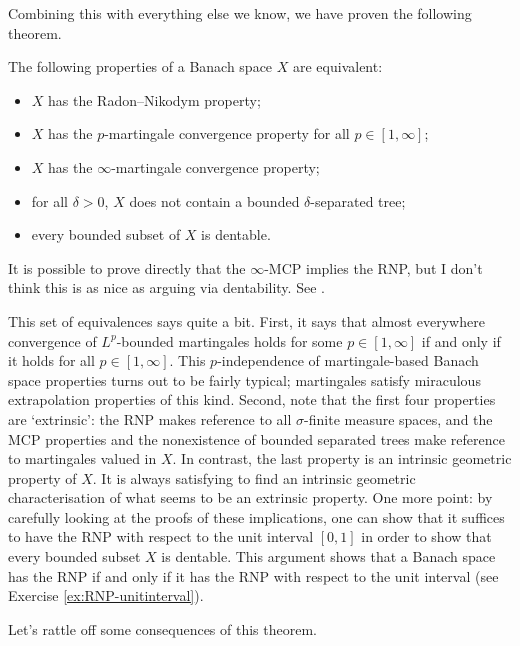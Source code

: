Combining this with everything else we know, we have proven the following theorem.
\begin{thm}\label{thm:RNP-characterisations}
  The following properties of a Banach space $X$ are equivalent:
  \begin{itemize}
  \item $X$ has the Radon--Nikodym property;
  \item $X$ has the $p$-martingale convergence property for all $p \in [1,\infty]$;
  \item $X$ has the $\infty$-martingale convergence property;
  \item for all $\delta > 0$, $X$ does not contain a bounded $\delta$-separated tree;
  \item every bounded subset of $X$ is dentable.
  \end{itemize}
\end{thm}

\begin{rmk}
  It is possible to prove directly that the $\infty$-MCP implies the RNP, but I don't think this is as nice as arguing via dentability.
  See \cite[Proof of Theorem 2.9]{gP16}.
\end{rmk}

This set of equivalences says quite a bit.
First, it says that almost everywhere convergence of $L^p$-bounded martingales holds for some $p \in [1,\infty]$ if and only if it holds for all $p \in [1,\infty]$.
This $p$-independence of martingale-based Banach space properties turns out to be fairly typical; martingales satisfy miraculous extrapolation properties of this kind.
Second, note that the first four properties are `extrinsic': the RNP makes reference to all $\sigma$-finite measure spaces, and the MCP properties and the nonexistence of bounded separated trees make reference to martingales valued in $X$.
In contrast, the last property is an intrinsic geometric property of $X$.
It is always satisfying to find an intrinsic geometric characterisation of what seems to be an extrinsic property.
One more point: by carefully looking at the proofs of these implications, one can show that it suffices to have the RNP with respect to the unit interval $[0,1]$ in order to show that every bounded subset $X$ is dentable.
This argument shows that a Banach space has the RNP if and only if it has the RNP with respect to the unit interval (see Exercise \ref{ex:RNP-unitinterval}).

Let's rattle off some consequences of this theorem.

